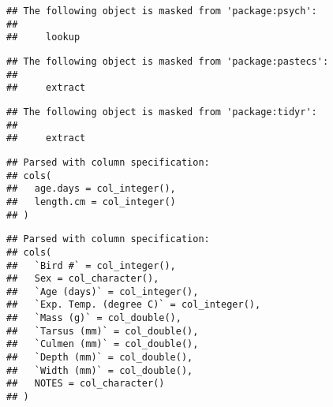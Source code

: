 \documentclass[]{article}
\newenvironment{Shaded}{\begin{snugshade}}{\end{snugshade}}
\newcommand{\KeywordTok}[1]{\textcolor[rgb]{0.13,0.29,0.53}{\textbf{#1}}}
\newcommand{\DataTypeTok}[1]{\textcolor[rgb]{0.13,0.29,0.53}{#1}}
\newcommand{\StringTok}[1]{\textcolor[rgb]{0.31,0.60,0.02}{#1}}
\newcommand{\OtherTok}[1]{\textcolor[rgb]{0.56,0.35,0.01}{#1}}
\newcommand{\OperatorTok}[1]{\textcolor[rgb]{0.81,0.36,0.00}{\textbf{#1}}}
\newcommand{\NormalTok}[1]{#1}
\begin{document}
\begin{verbatim}
## The following object is masked from 'package:psych':
## 
##     lookup
\end{verbatim}

\begin{verbatim}
## The following object is masked from 'package:pastecs':
## 
##     extract
\end{verbatim}

\begin{verbatim}
## The following object is masked from 'package:tidyr':
## 
##     extract
\end{verbatim}

\begin{Shaded}
\end{Shaded}

\begin{verbatim}
## Parsed with column specification:
## cols(
##   age.days = col_integer(),
##   length.cm = col_integer()
## )
\end{verbatim}

\begin{Shaded}
\end{Shaded}

\begin{verbatim}
## Parsed with column specification:
## cols(
##   `Bird #` = col_integer(),
##   Sex = col_character(),
##   `Age (days)` = col_integer(),
##   `Exp. Temp. (degree C)` = col_integer(),
##   `Mass (g)` = col_double(),
##   `Tarsus (mm)` = col_double(),
##   `Culmen (mm)` = col_double(),
##   `Depth (mm)` = col_double(),
##   `Width (mm)` = col_double(),
##   NOTES = col_character()
## )
\end{verbatim}
\end{document}
